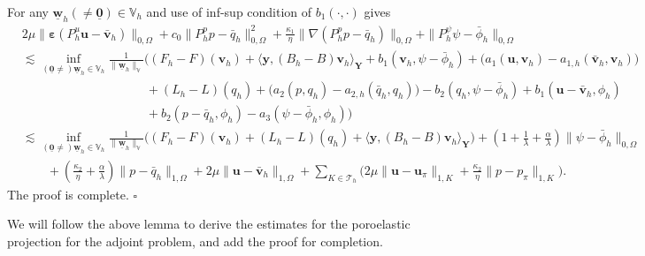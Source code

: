 \documentclass[smallextended]{svjour3}
\renewenvironment{proof}{\noindent{\it Proof.}}{\hfill$\square$}
\numberwithin{equation}{section}
\numberwithin{figure}{section}
\numberwithin{table}{section}
\newcommand\cero{{\boldsymbol{0}}}
\newcommand\beps{\boldsymbol{\varepsilon}}
\newcommand\buw{\underline{\boldsymbol{w}}}
\newcommand\by{\boldsymbol{y}}
\newcommand\bu{\boldsymbol{u}}
\newcommand\bv{\boldsymbol{v}}
\newcommand{\bY}{\boldsymbol{Y}}
\newcommand\cT{\mathcal{T}}
\newcommand{\bbV}{\mathbb{V}}
\begin{document}
\begin{proof}
    For any $\buw_h(\neq \underline{\cero}) \in \bbV_h$ and use of inf-sup condition of $b_1(\cdot, \cdot)$ 
    gives
    \begin{align*}
		& 2 \mu  \| \beps( P_h^u \bu - \bar{\bv}_h) \|_{0, \Omega}  + c_0 \| P_h^p p - \bar{q}_h\|_{0, \Omega}^2  + \frac{\kappa_1}{\eta} \| \nabla (P_h^p p - \bar{q}_h)\|_{0, \Omega} + 
        \| P_h^\psi \psi - \bar{\phi}_h \|_{0,\Omega}  \\
        & \lesssim \inf_{( \underline{\cero} \neq)\buw_h \in \bbV_h}\frac{1}{\|\buw_h\|_{\bbV}} \bigg( (F_h-F)(\bv_h) + \langle \by, (B_h-B) \bv_h \rangle_{\bY} + b_1(\bv_h, \psi-\bar{\phi}_h) + \big( a_1(\bu, \bv_h) - a_{1,h}(\bar{\bv}_h, \bv_h) \big)\\
        & \qquad \qquad \qquad \qquad \qquad  + (L_h-L)(q_h)  + \big( a_2(p, q_h) - a_{2,h}(\bar{q}_h, q_h) \big)  - b_2(q_h, \psi-\bar{\phi}_h) + b_1(\bu - \bar{\bv}_h, \phi_h) \\
        & \qquad \qquad \qquad \qquad \qquad +  b_2(p - \bar{q}_h, \phi_h)- a_3(\psi - \bar{\phi}_h, \phi_h) \bigg) \\
        & \lesssim \inf_{( \underline{\cero} \neq)\buw_h \in \bbV_h}\frac{1}{\|\buw_h\|_{\bbV}} \Big( (F_h-F)(\bv_h)  + (L_h-L)(q_h) + \langle \by, (B_h-B) \bv_h \rangle_{\bY} \Big) + \left( 1 + \frac{1}{\lambda} + \frac{\alpha}{\lambda} \right) \|\psi-\bar{\phi}_h\|_{0, \Omega} \\
        & \qquad +  \left(  \frac{\kappa_2}{\eta} + \frac{\alpha}{\lambda} \right) \| p- \bar{q}_h \|_{1, \Omega} + 2 \mu \| \bu - \bar{\bv}_h\|_{1, \Omega} + \sum_{K \in \cT_h} \Big( 2 \mu\|\bu - \bu_{\pi} \|_{1, K}  + \frac{\kappa_2}{\eta} \|p- p_{\pi}\|_{1, K} \Big).
    \end{align*}
    The proof is complete.
\end{proof}

\bigskip

We will follow the above lemma to derive the estimates for the poroelastic projection for the adjoint problem, and add the proof for completion.
\end{document}
